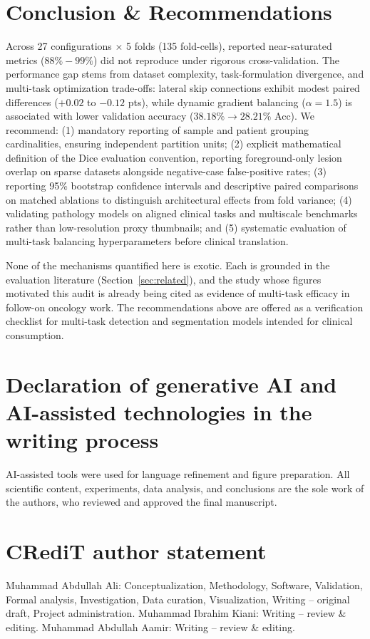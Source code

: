 \documentclass[preprint,12pt]{elsarticle}
\begin{document}
\section{Conclusion \& Recommendations}
Across 27 configurations $\times$ 5 folds (135 fold-cells), reported near-saturated metrics ($88\%-99\%$) did not reproduce under rigorous cross-validation. The performance gap stems from dataset complexity, task-formulation divergence, and multi-task optimization trade-offs: lateral skip connections exhibit modest paired differences ($+0.02$ to $-0.12$ pts), while dynamic gradient balancing ($\alpha=1.5$) is associated with lower validation accuracy ($38.18\% \to 28.21\%$ Acc). We recommend: (1) mandatory reporting of sample and patient grouping cardinalities, ensuring independent partition units; (2) explicit mathematical definition of the Dice evaluation convention, reporting foreground-only lesion overlap on sparse datasets alongside negative-case false-positive rates; (3) reporting 95\% bootstrap confidence intervals and descriptive paired comparisons on matched ablations to distinguish architectural effects from fold variance; (4) validating pathology models on aligned clinical tasks and multiscale benchmarks rather than low-resolution proxy thumbnails; and (5) systematic evaluation of multi-task balancing hyperparameters before clinical translation.

None of the mechanisms quantified here is exotic. Each is grounded in the evaluation literature (Section~\ref{sec:related}), and the study whose figures motivated this audit is already being cited as evidence of multi-task efficacy in follow-on oncology work. The recommendations above are offered as a verification checklist for multi-task detection and segmentation models intended for clinical consumption.

\section*{Declaration of generative AI and AI-assisted technologies in the writing process}
AI-assisted tools were used for language refinement and figure preparation. All scientific content, experiments, data analysis, and conclusions are the sole work of the authors, who reviewed and approved the final manuscript.

\section*{CRediT author statement}
Muhammad Abdullah Ali: Conceptualization, Methodology, Software, Validation, Formal analysis, Investigation, Data curation, Visualization, Writing -- original draft, Project administration. Muhammad Ibrahim Kiani: Writing -- review \& editing. Muhammad Abdullah Aamir: Writing -- review \& editing.
\end{document}
